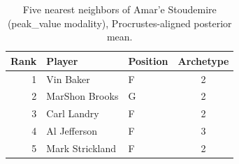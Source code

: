 \begin{table}[htbp]
  \centering\small
  \begin{tabular}{rllc}
    \toprule
    Rank & Player & Position & Archetype \\
    \midrule
    1 & Vin Baker & F & 2 \\
    2 & MarShon Brooks & G & 2 \\
    3 & Carl Landry & F & 2 \\
    4 & Al Jefferson & F & 3 \\
    5 & Mark Strickland & F & 2 \\
    \bottomrule
  \end{tabular}
  \caption{Five nearest neighbors of Amar'e Stoudemire (peak_value modality), Procrustes-aligned posterior mean.}
  \label{tab:Amar_e_Stoudemire_neighbors_peak_value}
\end{table}


